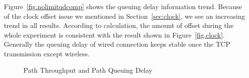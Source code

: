 Figure~\ref{fig.nolimitqdcomp} shows the queuing delay information trend. Because of the clock offset issue we mentioned in Section~\ref{sec:clock}, we see an increasing trend in all results. According to calculation, the amount of offset during the whole experiment is consistent with the result shown in Figure~\ref{fig.clock}. Generally the queuing delay of wired connection keeps stable once the TCP transmission except wireless. 


\begin{figure}[htb]
\caption{Path Throughput and Path Queuing Delay}
\label{fig.mpip_path}
\end{figure}


